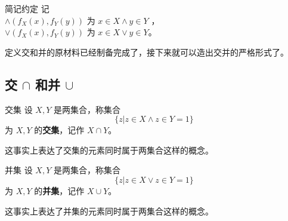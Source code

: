 \begin{definition}{简记约定}
记\\
 $\land(f_X(x),f_Y(y))$ 为 $x\in X\land y\in Y$ ，\\
$\lor(f_X(x),f_Y(y))$ 为 $x\in X\lor y\in Y$。
\end{definition}
定义交和并的原材料已经制备完成了，接下来就可以造出交并的严格形式了。
\subsection{交 $\cap$ 和并 $\cup$}
\begin{definition}{交集}
设 $X,Y$ 是两集合，称集合
\begin{equation}
\{z|z\in X\land z\in Y=1 \}~
\end{equation}
为 $X,Y$ 的\textbf{交集}，记作 $X\cap Y$。
\end{definition}
这事实上表达了交集的元素同时属于两集合这样的概念。
\begin{definition}{并集}
设 $X,Y$ 是两集合，称集合
\begin{equation}
\{z|z\in X\lor z\in Y=1 \}~
\end{equation}
为 $X,Y$ 的\textbf{并集}，记作 $X\cup Y$。
\end{definition}
这事实上表达了并集的元素同时属于两集合这样的概念。